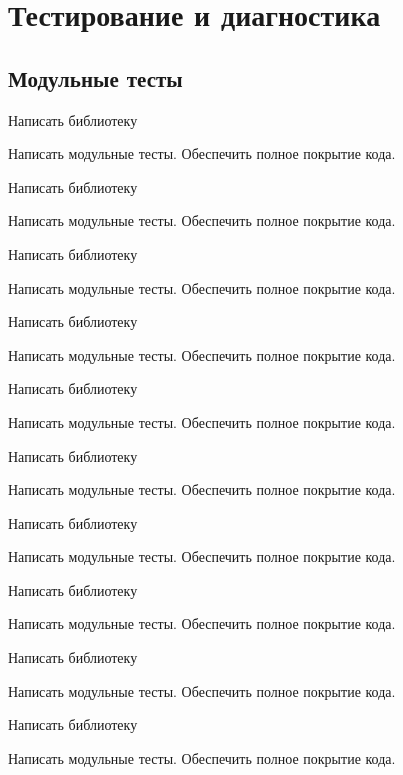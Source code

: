 \section{Тестирование и диагностика}

\subsection{Модульные тесты}

\task Написать библиотеку

Написать модульные тесты. Обеспечить полное покрытие кода.

\task  Написать библиотеку

Написать модульные тесты. Обеспечить полное покрытие кода.

\task  Написать библиотеку

Написать модульные тесты. Обеспечить полное покрытие кода.

\task  Написать библиотеку

Написать модульные тесты. Обеспечить полное покрытие кода.

\task  Написать библиотеку

Написать модульные тесты. Обеспечить полное покрытие кода.

\task  Написать библиотеку

Написать модульные тесты. Обеспечить полное покрытие кода.

\task  Написать библиотеку

Написать модульные тесты. Обеспечить полное покрытие кода.

\task  Написать библиотеку

Написать модульные тесты. Обеспечить полное покрытие кода.

\task  Написать библиотеку

Написать модульные тесты. Обеспечить полное покрытие кода.

\task  Написать библиотеку

Написать модульные тесты. Обеспечить полное покрытие кода.

